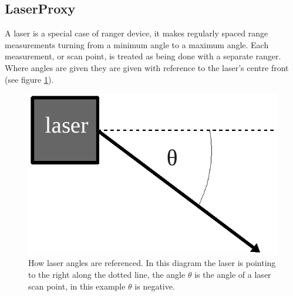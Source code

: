 \documentclass[a4paper]{report}
\begin{document}
\subsection{LaserProxy}
A laser is a special case of ranger device, it makes regularly spaced range measurements turning from a minimum angle to a maximum angle. Each measurement, or scan point, is treated as being done with a separate ranger. Where angles are given they are given with reference to the laser's centre front (see figure \ref{fig:laserangles}).


\begin{figure}
	\centering
	\includegraphics[width=0.8\linewidth]{./pics/coding/laserscanner2.png}
	\caption{How laser angles are referenced. In this diagram the laser is pointing to the right along the dotted line, the angle $\theta$ is the angle of a laser scan point, in this example $\theta$ is negative.}
	\label{fig:laserangles}
\end{figure} 
\end{document}
